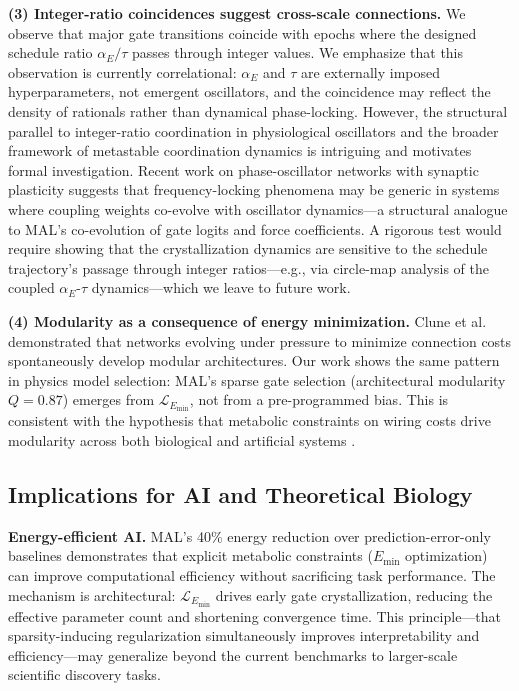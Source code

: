 \documentclass[9pt,twocolumn,twoside]{pnas-new}
\begin{document}
\textbf{(3) Integer-ratio coincidences suggest cross-scale connections.} We observe that major gate transitions coincide with epochs where the designed schedule ratio $\alpha_E / \tau$ passes through integer values. We emphasize that this observation is currently correlational: $\alpha_E$ and $\tau$ are externally imposed hyperparameters, not emergent oscillators, and the coincidence may reflect the density of rationals rather than dynamical phase-locking. However, the structural parallel to integer-ratio coordination in physiological oscillators \cite{Hoyer2001, Gebber1997} and the broader framework of metastable coordination dynamics \cite{Schoner1988, Kelso1995, Tognoli2014, Kelso2012, Kelso2021} is intriguing and motivates formal investigation. Recent work on phase-oscillator networks with synaptic plasticity \cite{Chauhan2022} suggests that frequency-locking phenomena may be generic in systems where coupling weights co-evolve with oscillator dynamics---a structural analogue to MAL's co-evolution of gate logits and force coefficients. A rigorous test would require showing that the crystallization dynamics are sensitive to the schedule trajectory's passage through integer ratios---e.g., via circle-map analysis of the coupled $\alpha_E$-$\tau$ dynamics---which we leave to future work.

\textbf{(4) Modularity as a consequence of energy minimization.} Clune et al.\ \cite{Clune2013} demonstrated that networks evolving under pressure to minimize connection costs spontaneously develop modular architectures. Our work shows the same pattern in physics model selection: MAL's sparse gate selection (architectural modularity $Q = 0.87$) emerges from $\mathcal{L}_{E_{\min}}$, not from a pre-programmed bias. This is consistent with the hypothesis that metabolic constraints on wiring costs drive modularity across both biological \cite{Bullmore2012} and artificial systems \cite{Clune2013}.

\subsection*{Implications for AI and Theoretical Biology}
\textbf{Energy-efficient AI.} MAL's 40\% energy reduction over prediction-error-only baselines demonstrates that explicit metabolic constraints ($E_{\min}$ optimization) can improve computational efficiency without sacrificing task performance. The mechanism is architectural: $\mathcal{L}_{E_{\min}}$ drives early gate crystallization, reducing the effective parameter count and shortening convergence time. This principle---that sparsity-inducing regularization simultaneously improves interpretability and efficiency---may generalize beyond the current benchmarks to larger-scale scientific discovery tasks.
\end{document}
